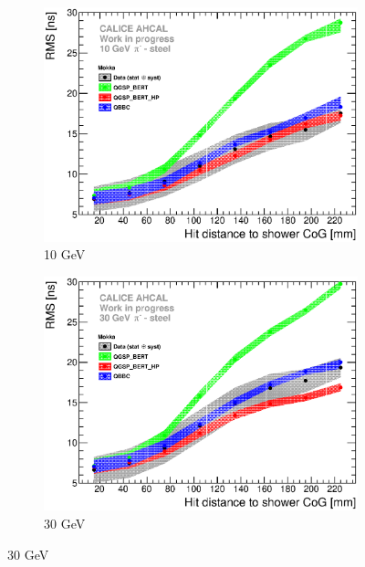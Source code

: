 \begin{figure}[htbp!]
  \begin{subfigure}[t]{0.49\textwidth}
    \centering
    \includegraphics[width=1\textwidth]{../Thesis_Plots/Timing/Pions/Plots/ComparisonToSim/RMS_Radius_10GeV_SSF_Mokka.eps}
    \caption{10 GeV}\label{fig:Radius_SSF_RMS_SimData_10GeV}
  \end{subfigure}
  \hfill
  \begin{subfigure}[t]{0.49\textwidth}
    \centering
    \includegraphics[width=1\textwidth]{../Thesis_Plots/Timing/Pions/Plots/ComparisonToSim/RMS_Radius_30GeV_SSF_Mokka.eps}
    \caption{30 GeV}\label{fig:Radius_SSF_RMS_SimData_30GeV}
  \end{subfigure}
  \hfill

\end{figure}
